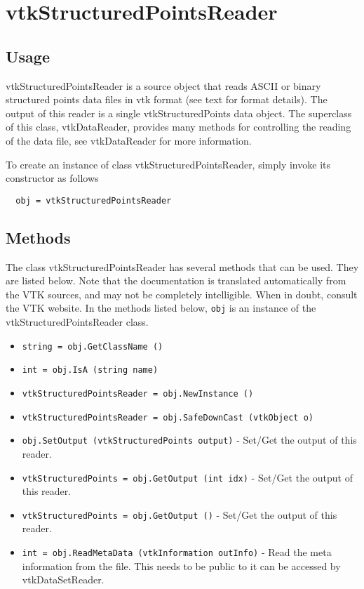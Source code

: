 \section{vtkStructuredPointsReader}

\subsection{Usage}

 vtkStructuredPointsReader is a source object that reads ASCII or binary 
 structured points data files in vtk format (see text for format details).
 The output of this reader is a single vtkStructuredPoints data object.
 The superclass of this class, vtkDataReader, provides many methods for
 controlling the reading of the data file, see vtkDataReader for more
 information.

To create an instance of class vtkStructuredPointsReader, simply
invoke its constructor as follows
\begin{verbatim}
  obj = vtkStructuredPointsReader
\end{verbatim}
\subsection{Methods}

The class vtkStructuredPointsReader has several methods that can be used.
  They are listed below.
Note that the documentation is translated automatically from the VTK sources,
and may not be completely intelligible.  When in doubt, consult the VTK website.
In the methods listed below, \verb|obj| is an instance of the vtkStructuredPointsReader class.
\begin{itemize}
\item  \verb|string = obj.GetClassName ()|

\item  \verb|int = obj.IsA (string name)|

\item  \verb|vtkStructuredPointsReader = obj.NewInstance ()|

\item  \verb|vtkStructuredPointsReader = obj.SafeDownCast (vtkObject o)|

\item  \verb|obj.SetOutput (vtkStructuredPoints output)| -  Set/Get the output of this reader.

\item  \verb|vtkStructuredPoints = obj.GetOutput (int idx)| -  Set/Get the output of this reader.

\item  \verb|vtkStructuredPoints = obj.GetOutput ()| -  Set/Get the output of this reader.

\item  \verb|int = obj.ReadMetaData (vtkInformation outInfo)| -  Read the meta information from the file.  This needs to be public to it
 can be accessed by vtkDataSetReader.

\end{itemize}
